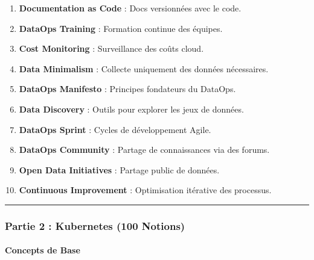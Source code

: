 \documentclass[
  letterpaper,
  DIV=11,
  numbers=noendperiod]{scrartcl}
\makeatletter
\let\oldparagraph\paragraph
\renewcommand{\paragraph}{
    \@ifstar
      \xxxParagraphStar
      \xxxParagraphNoStar
  }
\newcommand{\xxxParagraphStar}[1]{\oldparagraph*{#1}\mbox{}}
\newcommand{\xxxParagraphNoStar}[1]{\oldparagraph{#1}\mbox{}}
\providecommand{\tightlist}{%
  \setlength{\itemsep}{0pt}\setlength{\parskip}{0pt}}\usepackage{longtable,booktabs,array}
\makeatother
\begin{document}
\begin{enumerate}
\def\labelenumi{\arabic{enumi}.}
\setcounter{enumi}{90}
\tightlist
\item
  \textbf{Documentation as Code} : Docs versionnées avec le code.\\
\item
  \textbf{DataOps Training} : Formation continue des équipes.\\
\item
  \textbf{Cost Monitoring} : Surveillance des coûts cloud.\\
\item
  \textbf{Data Minimalism} : Collecte uniquement des données
  nécessaires.\\
\item
  \textbf{DataOps Manifesto} : Principes fondateurs du DataOps.\\
\item
  \textbf{Data Discovery} : Outils pour explorer les jeux de données.\\
\item
  \textbf{DataOps Sprint} : Cycles de développement Agile.\\
\item
  \textbf{DataOps Community} : Partage de connaissances via des
  forums.\\
\item
  \textbf{Open Data Initiatives} : Partage public de données.\\
\item
  \textbf{Continuous Improvement} : Optimisation itérative des
  processus.
\end{enumerate}

\begin{center}\rule{0.5\linewidth}{0.5pt}\end{center}

\subsubsection{\texorpdfstring{\textbf{Partie 2 : Kubernetes (100
Notions)}}{Partie 2 : Kubernetes (100 Notions)}}\label{partie-2-kubernetes-100-notions}

\paragraph{\texorpdfstring{\textbf{Concepts de
Base}}{Concepts de Base}}\label{concepts-de-base}
\end{document}
